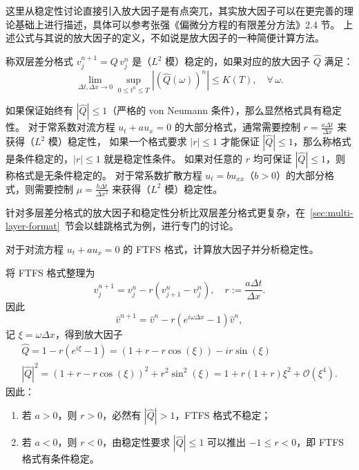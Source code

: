 \begin{remark}
    这里从稳定性讨论直接引入放大因子是有点突兀，其实放大因子可以在更完善的理论基础上进行描述，具体可以参考张强《偏微分方程的有限差分方法》2.4 节。
    上述公式与其说的放大因子的定义，不如说是放大因子的一种简便计算方法。
\end{remark}

\begin{definition}
    称双层差分格式 $v_j^{n+1} = Q\,v_j^n$ 是（$L^2$ 模）稳定的，如果对应的放大因子 $\widehat{Q}$ 满足：
    \[
        \lim_{\Delta t, \Delta x \to 0} \sup_{0 \le t^n \le T} |(\widehat{Q}(\omega ))^n| \le K(T), \quad \forall\,\omega.
    \]
\end{definition}

如果保证始终有 $|\widehat{Q}| \le 1$（严格的 von Neumann 条件），那么显然格式具有稳定性。
对于常系数对流方程 $u_t + a u_x = 0$ 的大部分格式，通常需要控制 $r = \frac{a \Delta t}{\Delta x}$ 来获得（$L^2$ 模）稳定性，
如果一个格式要求 $|r| \le 1$ 才能保证 $|\widehat{Q}| \le 1$，那么称格式是条件稳定的，$|r| \le 1$ 就是稳定性条件。
如果对任意的 $r$ 均可保证 $|\widehat{Q}| \le 1$，则称格式是无条件稳定的。
对于常系数扩散方程 $u_t = b u_{xx}$（$b > 0$）的大部分格式，则需要控制 $\mu = \frac{b \Delta t}{\Delta x^2}$ 来获得（$L^2$ 模）稳定性。

\begin{remark}
    针对多层差分格式的放大因子和稳定性分析比双层差分格式更复杂，在~\ref{sec:multi-layer-format}~节会以蛙跳格式为例，进行专门的讨论。
\end{remark}

\begin{example}\label{eg:ftfs}
    对于对流方程 $u_t + a u_x = 0$ 的 FTFS 格式，计算放大因子并分析稳定性。
\end{example}

\begin{solution*}
    将 FTFS 格式整理为
    \[
        v_j^{n+1} = v_j^n - r \left( v_{j+1}^n - v_{j}^n \right), \quad r := \frac{a \Delta t}{\Delta x}.
    \]
    因此
    \[
        \hat{v}^{n+1} = \hat{v}^n - r (e^{i \omega \Delta x} - 1) \hat{v}^n,
    \]
    记 $\xi = \omega \Delta x$，得到放大因子
    \begin{gather*}
        \widehat{Q} ={}   1 - r (e^{i \xi} - 1)  = (1 + r - r \cos(\xi)) - i r \sin(\xi)     \\
        |\widehat{Q}|^2 ={} (1 + r - r \cos(\xi))^2 + r^2 \sin^2(\xi) = 1 + r(1+r) \xi^2 + \mathcal{O}(\xi^4).
    \end{gather*}
    因此：
    \begin{enumerate}
        \item 若 $a > 0$，则 $r > 0$，必然有 $|\widehat{Q}| > 1$，FTFS 格式不稳定；
        \item 若 $a < 0$，则 $r < 0$，由稳定性要求 $|\widehat{Q}| \le 1$ 可以推出 $-1 \le r < 0$，即 FTFS 格式有条件稳定。
    \end{enumerate}
\end{solution*}

